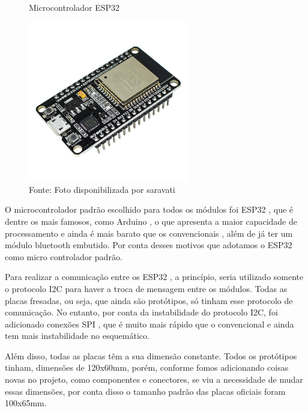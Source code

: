 \documentclass[../delivery_hospital_report.tex]{subfiles}
\begin{document}
\begin{figure}
\caption{Microcontrolador ESP32}\label{wrap-fig:1}
\includegraphics[width=7cm]{esp32_doidkit_v1.jpg}
\caption*{Fonte: Foto disponibilizada por saravati}\label{wrap-fig:1}
\end{figure} 

O microcontrolador padrão escolhido para todos os módulos foi ESP32 \cite{esp32}, que é dentre os mais famosos, como Arduino \cite{arduino}, o que apresenta a maior capacidade de  processamento e ainda é mais barato que os convencionais \cite{esp32_better}, além de já ter um módulo bluetooth embutido. Por conta desses motivos que adotamos o ESP32 como micro controlador padrão.

Para realizar a comunicação entre os ESP32 \cite{esp32}, a princípio, seria utilizado somente o protocolo I2C \cite{i2c} para haver a troca de mensagem entre os módulos. Todas as placas fresadas, ou seja, que ainda são protótipos, só tinham esse protocolo de comunicação. No entanto, por conta da instabilidade do protocolo I2C, foi adicionado conexões SPI \cite{spi}, que é muito mais rápido que o convencional e ainda tem mais instabilidade no esquemático.

Além disso, todas as placas têm a sua dimensão constante. Todos os protótipos tinham, dimensões de 120x60mm, porém, conforme fomos adicionando coisas novas no projeto, como componentes e conectores, se viu a necessidade de mudar essas dimensões, por conta disso o tamanho padrão das placas oficiais foram 100x65mm.




\end{document}
